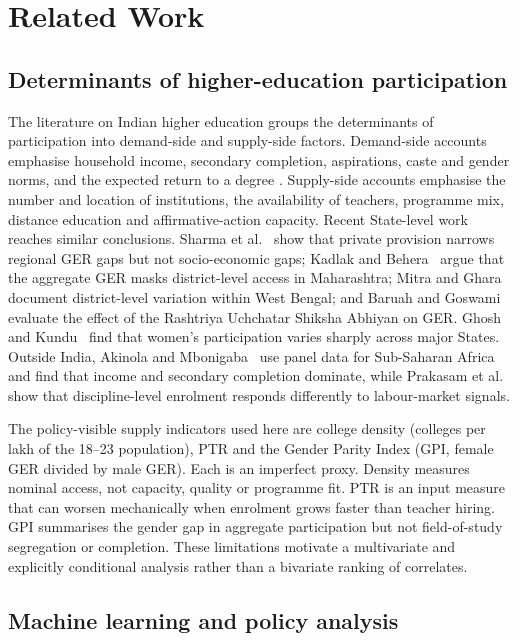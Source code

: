 \section{Related Work}\label{sec:related}

\subsection{Determinants of higher-education participation}

The literature on Indian higher education groups the determinants of participation into demand-side and supply-side factors. Demand-side accounts emphasise household income, secondary completion, aspirations, caste and gender norms, and the expected return to a degree \cite{sharma2026,ghosh2021}. Supply-side accounts emphasise the number and location of institutions, the availability of teachers, programme mix, distance education and affirmative-action capacity. Recent State-level work reaches similar conclusions. Sharma et al.~\cite{sharma2026} show that private provision narrows regional GER gaps but not socio-economic gaps; Kadlak and Behera~\cite{kadlak2026} argue that the aggregate GER masks district-level access in Maharashtra; Mitra and Ghara~\cite{mitra2019} document district-level variation within West Bengal; and Baruah and Goswami~\cite{baruah2024} evaluate the effect of the Rashtriya Uchchatar Shiksha Abhiyan on GER. Ghosh and Kundu~\cite{ghosh2021} find that women's participation varies sharply across major States. Outside India, Akinola and Mbonigaba~\cite{akinola2020} use panel data for Sub-Saharan Africa and find that income and secondary completion dominate, while Prakasam et al.~\cite{prakasam2019} show that discipline-level enrolment responds differently to labour-market signals.

The policy-visible supply indicators used here are college density (colleges per lakh of the 18--23 population), PTR and the Gender Parity Index (GPI, female GER divided by male GER). Each is an imperfect proxy. Density measures nominal access, not capacity, quality or programme fit. PTR is an input measure that can worsen mechanically when enrolment grows faster than teacher hiring. GPI summarises the gender gap in aggregate participation but not field-of-study segregation or completion. These limitations motivate a multivariate and explicitly conditional analysis rather than a bivariate ranking of correlates.

\subsection{Machine learning and policy analysis}

